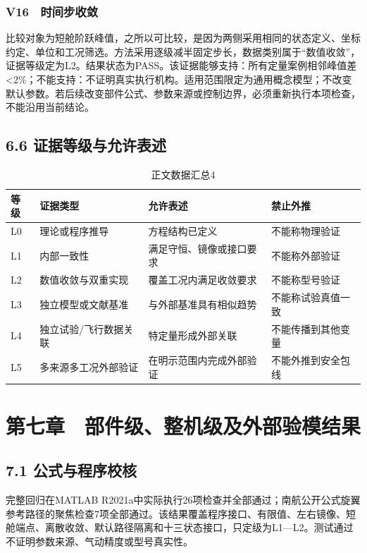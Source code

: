 \documentclass[UTF8,12pt,openany]{ctexbook}
\begin{document}
\subsection{V16　时间步收敛}

比较对象为短舱阶跃峰值，之所以可比较，是因为两侧采用相同的状态定义、坐标约定、单位和工况筛选。方法采用逐级减半固定步长，数据类别属于“数值收敛”，证据等级定为L2。结果状态为PASS。该证据能够支持：所有定量案例相邻峰值差<2\%；不能支持：不证明真实执行机构。适用范围限定为通用概念模型；不改变默认参数。若后续改变部件公式、参数来源或控制边界，必须重新执行本项检查，不能沿用当前结论。

\section{6.6 证据等级与允许表述}

\begin{longtable}{p{}p{}p{}p{}}
\caption{正文数据汇总4}\label{tab:auto-4}\\
\toprule
等级 & 证据类型 & 允许表述 & 禁止外推 \\
\midrule
L0 & 理论或程序推导 & 方程结构已定义 & 不能称物理验证 \\
L1 & 内部一致性 & 满足守恒、镜像或接口要求 & 不能称外部验证 \\
L2 & 数值收敛与双重实现 & 覆盖工况内满足收敛要求 & 不能称型号验证 \\
L3 & 独立模型或文献基准 & 与外部基准具有相似趋势 & 不能称试验真值一致 \\
L4 & 独立试验/飞行数据关联 & 特定量形成外部关联 & 不能传播到其他变量 \\
L5 & 多来源多工况外部验证 & 在明示范围内完成外部验证 & 不能外推到安全包线 \\
\bottomrule
\end{longtable}


\chapter{第七章　部件级、整机级及外部验模结果}

\section{7.1 公式与程序校核}

完整回归在MATLAB R2021a中实际执行26项检查并全部通过；南航公开公式旋翼参考路径的聚焦检查7项全部通过。该结果覆盖程序接口、有限值、左右镜像、短舱端点、离散收敛、默认路径隔离和十三状态接口，只定级为L1—L2。测试通过不证明参数来源、气动精度或型号真实性。
\end{document}
